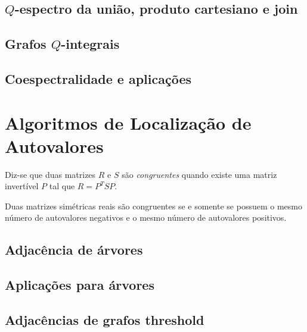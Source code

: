 \documentclass{article}
\begin{document}
\subsection{\(Q\)-espectro da união, produto cartesiano e join}
\subsection{Grafos \(Q\)-integrais}
\subsection{Coespectralidade e aplicações}

\section{Algoritmos de Localização de Autovalores}

\begin{defn}
    Diz-se que duas matrizes \(R\) e \(S\) são \emph{congruentes} quando existe uma matriz invertível \(P\) tal que \(R = P^T S P\).
\end{defn}

\begin{thm} 
    Duas matrizes simétricas reais são congruentes se e somente se possuem o mesmo número de autovalores negativos e o mesmo número de autovalores positivos.
\end{thm}

\subsection{Adjacência de árvores}
\subsection{Aplicações para árvores}
\subsection{Adjacências de grafos threshold}
\end{document}
